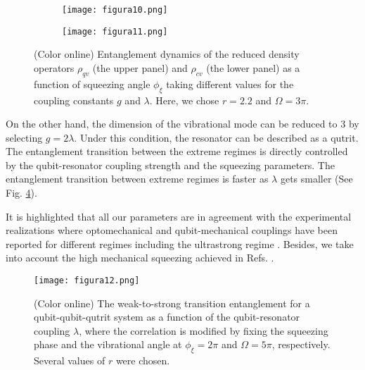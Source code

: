 \begin{figure}[h!]

\begin{subfigure}{\textwidth}
\texttt{[image: figura10.png]}
\caption{}
\label{fig4a}
\end{subfigure}

\bigskip

\begin{subfigure}{\textwidth}
\texttt{[image: figura11.png]}
\caption{}
\label{fig4b}
\end{subfigure}

\caption{(Color online) Entanglement dynamics of the reduced density operators $\rho_{qv}$ (the upper panel) and $\rho_{cv}$ (the lower panel) as a function of squeezing angle $\phi_{\xi}$ taking different values for the coupling constants $g$ and $\lambda$. Here, we chose $r=2.2$ and $\Omega=3\pi$.}
\label{fig4}

\end{figure}

On the other hand, the dimension of the vibrational mode can be reduced to 3 by selecting $g=2\lambda$. Under this condition, the resonator can be described as a qutrit. The entanglement transition between the extreme regimes is directly controlled by the qubit-resonator coupling strength and the squeezing parameters. The entanglement transition between extreme regimes is faster as $\lambda$ gets smaller (See Fig. \ref{fig5}). 

It is highlighted that all our parameters are in agreement with the experimental realizations where optomechanical and qubit-mechanical couplings have been reported for different regimes including the ultrastrong regime \cite{murch2008observation, teufel2011sideband, xuereb2012strong,benz2016single, das2023instabilities}. Besides, we take into account the high mechanical squeezing achieved in Refs. \cite{xiong2020strong, bai2020strong}.

\begin{figure}
	\centering
	\texttt{[image: figura12.png]}
	\caption{(Color online) The weak-to-strong transition entanglement for a qubit-qubit-qutrit system as a function of the qubit-resonator coupling $\lambda$, where the correlation is modified by fixing the squeezing phase and the vibrational angle at $\phi_{\xi}=2\pi$ and $\Omega=5\pi$, respectively. Several values of $r$ were chosen.}
	\label{fig5}
\end{figure}


